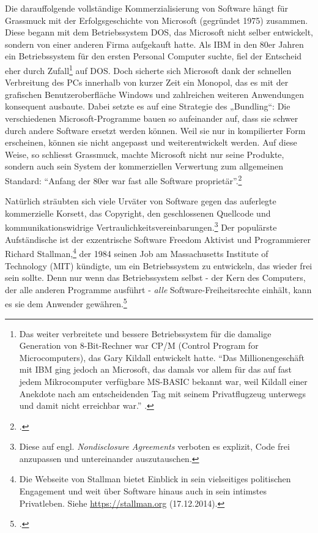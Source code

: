 \documentclass[
paper=164mm:234mm, %
pagesize, %
DIV=calc, %
10pt, %
parskip=half- %
]{scrbook}
\begin{document}
Die darauffolgende vollständige Kommerzialisierung von Software hängt für Grassmuck mit der Erfolgsgeschichte von Microsoft (gegründet 1975) zusammen. Diese begann mit dem Betriebssystem DOS, das Microsoft nicht selber entwickelt, sondern von einer anderen Firma aufgekauft hatte. Als IBM in den 80er Jahren ein Betriebssystem für den ersten Personal Computer suchte, fiel der Entscheid eher durch Zufall\footnote{Das weiter verbreitete und bessere Betriebssystem für die damalige Generation von 8-Bit-Rechner war CP/M (Control Program for Microcomputers), das Gary Kildall entwickelt hatte. \enquote{Das Millionengeschäft mit IBM ging jedoch an Microsoft, das damals vor allem für das auf fast jedem Mikrocomputer verfügbare MS-BASIC bekannt war, weil Kildall einer Anekdote nach am entscheidenden Tag mit seinem Privatflugzeug unterwegs und damit nicht erreichbar war.} \cite[205]{Grassmuck:2004}.} auf DOS. Doch sicherte sich Microsoft dank der schnellen Verbreitung des PCs innerhalb von kurzer Zeit ein Monopol, das es mit der grafischen Benutzeroberfläche Windows und zahlreichen weiteren Anwendungen konsequent ausbaute. Dabei setzte es auf eine Strategie des „Bundling“: Die verschiedenen Microsoft-Programme bauen so aufeinander auf, dass sie schwer durch andere Software ersetzt werden können. Weil sie nur in kompilierter Form erscheinen, können sie nicht angepasst und weiterentwickelt werden. Auf diese Weise, so schliesst Grassmuck, machte Microsoft nicht nur seine Produkte, sondern auch sein System der kommerziellen Verwertung zum allgemeinen Standard: \enquote{Anfang der 80er war fast alle Software proprietär}.\footnote{\cite[221]{Grassmuck:2004}.}

Natürlich sträubten sich viele Urväter von Software gegen das auferlegte kommerzielle Korsett, das Copyright, den geschlossenen Quellcode und kommunikationswidrige Vertraulichkeitsvereinbarungen.\footnote{Diese auf engl. \emph{Nondisclosure Agreements} verboten es explizit, Code frei anzupassen und untereinander auszutauschen.} Der populärste Aufständische ist der exzentrische Software Freedom Aktivist und Programmierer Richard Stallman,\footnote{Die Webseite von Stallman bietet Einblick in sein vielseitiges politischen Engagement und weit über Software hinaus auch in sein intimstes Privatleben. Siehe \url{https://stallman.org} (17.12.2014).} der 1984 seinen Job am Massachusetts Institute of Technology (MIT) kündigte, um ein Betriebssystem zu entwickeln, das wieder frei sein sollte. Denn nur wenn das Betriebssystem selbst - der Kern des Computers, der alle anderen Programme ausführt - \emph{alle} Software-Freiheitsrechte einhält, kann es sie dem Anwender gewähren.\footnote{\cite[9]{Stallman:2010}.}
\end{document}
